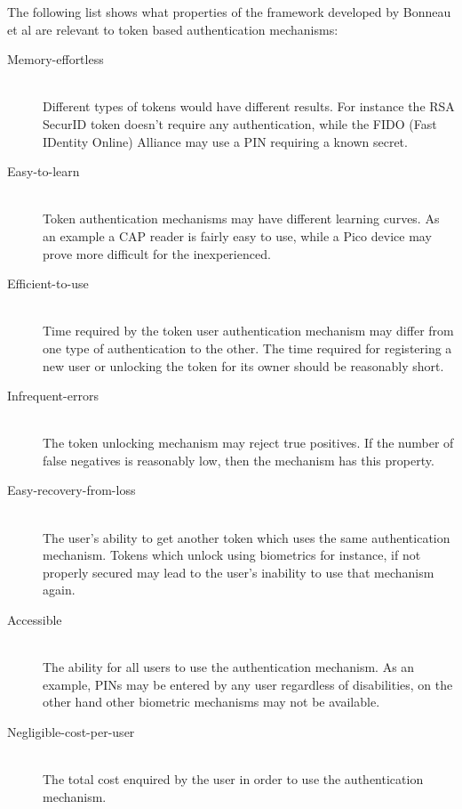 The following list shows what properties of the framework developed by Bonneau et al are relevant to token based authentication mechanisms:
\begin{description}
  \item[Memory-effortless] \hfill \\
  Different types of tokens would have different results. For instance the RSA SecurID \cite{} token doesn't require any authentication, while the FIDO (Fast IDentity Online) Alliance \cite{} may use a PIN requiring a known secret.
  
  \item[Easy-to-learn] \hfill \\
  Token authentication mechanisms may have different learning curves. As an example a CAP reader is fairly easy to use, while a Pico device may prove more difficult for the inexperienced.
  
  \item[Efficient-to-use] \hfill \\
  Time required by the token user authentication mechanism may differ from one type of authentication to the other. The time required for registering a new user or unlocking the token for its owner should be reasonably short.
  
  \item[Infrequent-errors] \hfill \\
  The token unlocking mechanism may reject true positives. If the number of false negatives is reasonably low, then the mechanism has this property.
  
  \item[Easy-recovery-from-loss] \hfill \\
  The user's ability to get another token which uses the same authentication mechanism. Tokens which unlock using biometrics for instance, if not properly secured may lead to the user's inability to use that mechanism again.
  
  \item[Accessible] \hfill \\
  The ability for all users to use the authentication mechanism. As an example, PINs may be entered by any user regardless of disabilities, on the other hand other biometric mechanisms may not be available.
  
  \item[Negligible-cost-per-user] \hfill \\
  The total cost enquired by the user in order to use the authentication mechanism.
  

\end{description}

